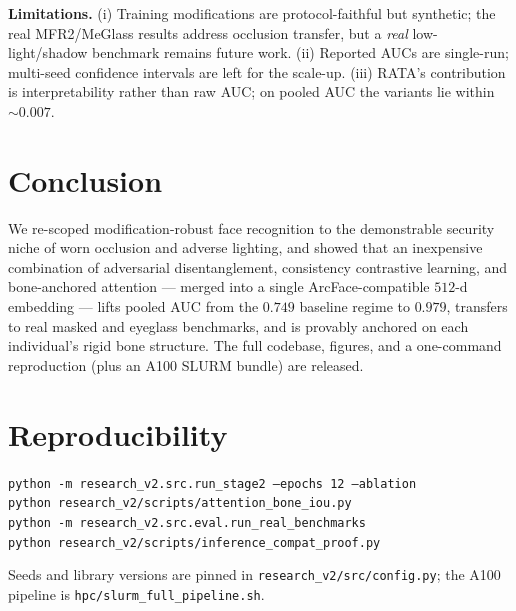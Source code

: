 \documentclass[10pt,conference]{IEEEtran}
\begin{document}
\textbf{Limitations.} (i) Training modifications are protocol-faithful but
synthetic; the real MFR2/MeGlass results address occlusion transfer, but a
\emph{real} low-light/shadow benchmark remains future work. (ii) Reported AUCs
are single-run; multi-seed confidence intervals are left for the scale-up.
(iii) RATA's contribution is interpretability rather than raw AUC; on pooled
AUC the variants lie within $\sim\!0.007$.

\section{Conclusion}
\label{sec:concl}
We re-scoped modification-robust face recognition to the demonstrable security
niche of worn occlusion and adverse lighting, and showed that an inexpensive
combination of adversarial disentanglement, consistency contrastive learning,
and bone-anchored attention --- merged into a single ArcFace-compatible
$512$-d embedding --- lifts pooled AUC from the $0.749$ baseline regime to
$0.979$, transfers to real masked and eyeglass benchmarks, and is provably
anchored on each individual's rigid bone structure. The full codebase, figures,
and a one-command reproduction (plus an A100 SLURM bundle) are released.

\section*{Reproducibility}
\noindent\texttt{python -m research\_v2.src.run\_stage2 --epochs 12 --ablation} \\
\noindent\texttt{python research\_v2/scripts/attention\_bone\_iou.py} \\
\noindent\texttt{python -m research\_v2.src.eval.run\_real\_benchmarks} \\
\noindent\texttt{python research\_v2/scripts/inference\_compat\_proof.py}

\noindent Seeds and library versions are pinned in
\texttt{research\_v2/src/config.py}; the A100 pipeline is
\texttt{hpc/slurm\_full\_pipeline.sh}.
\end{document}
